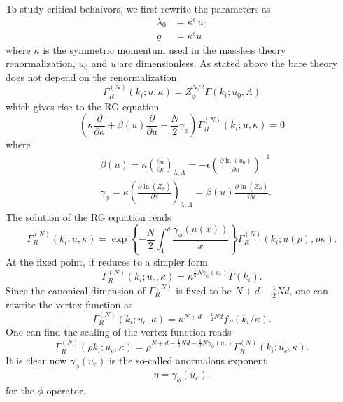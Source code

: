\documentclass[submission, PhysLectNotes]{SciPost}
\begin{document}
To study critical behaivors, we first rewrite the parameters as 
\begin{equation}
	\begin{aligned}
		\lambda_0 &= \kappa^\epsilon \, u_0 \\
		g &= \kappa^\epsilon u
	\end{aligned}
\end{equation}
where $\kappa$ is the symmetric momentum used in the massless theory renormalization, $u_0$ and $u$ are dimensionless. As stated above the bare theory does not depend on the renormalization 
\begin{equation}
	\Gamma_R^{(N)}(k_i; u, \kappa) = Z_\phi^{N/2} \Gamma (k_i;u_0,\Lambda)
\end{equation}
which gives rise to the RG equation
\begin{equation}
	\left(\kappa\frac{\partial}{\partial \kappa} + \beta(u)\frac{\partial}{\partial u} - \frac{N}{2}\gamma_\phi \right)\Gamma_R^{(N)}(k_i;u,\kappa) = 0
\end{equation}
where 
\begin{equation}
	\begin{aligned}
		&\beta(u) = \kappa\left(\frac{\partial u}{\partial \kappa}\right)_{\lambda,\Lambda} = -\epsilon\left(\frac{\partial \ln(u_0)}{\partial u}\right)^{-1}\\
		&\gamma_\phi = \kappa \left(\frac{\partial \ln(Z_\phi)}{\partial \kappa}\right)_{\lambda,\Lambda} = \beta(u)\frac{\partial \ln(Z_\phi)}{\partial u}.
	\end{aligned}
\end{equation}
The solution of the RG equation reads
\begin{equation}
	\Gamma_R^{(N)}(k_i;u,\kappa) = \exp\left\{-\frac{N}{2}\int_1^\rho \frac{\gamma_\phi(u(x))}{x}\right\} \Gamma_R^{(N)}(k_i;u(\rho),\rho\kappa).
\end{equation}
At the fixed point, it reduces to a simpler form
\begin{equation}
	\Gamma_R^{(N)}(k_i;u_c,\kappa) = \kappa^{\frac{1}{2}N\gamma_\phi(u_c)} \tilde{\Gamma}(k_i).
\end{equation}
Since the canonical dimension of $\Gamma_R^{(N)}$ is fixed to be $N+d-\frac{1}{2}Nd$, one can rewrite the vertex function as 
\begin{equation}
	\Gamma_R^{(N)}(k_i;u_c,\kappa) = \kappa^{N+d-\frac{1}{2}Nd} f_\Gamma(k_i/\kappa).
\end{equation}
One can find the scaling of the vertex function reads
\begin{equation}
	\Gamma_R^{(N)}(\rho k_i;u_c,\kappa) = \rho^{N+d-\frac{1}{2}Nd - \frac{1}{2}N\gamma_\phi(u_c)} \Gamma_R^{(N)}(k_i;u_c,\kappa).
\end{equation}
It is clear now $\gamma_\phi(u_c)$ is the so-called anormalous exponent 
\begin{equation}
	\eta = \gamma_\phi(u_c).
\end{equation}
for the $\phi$ operator.
\end{document}
